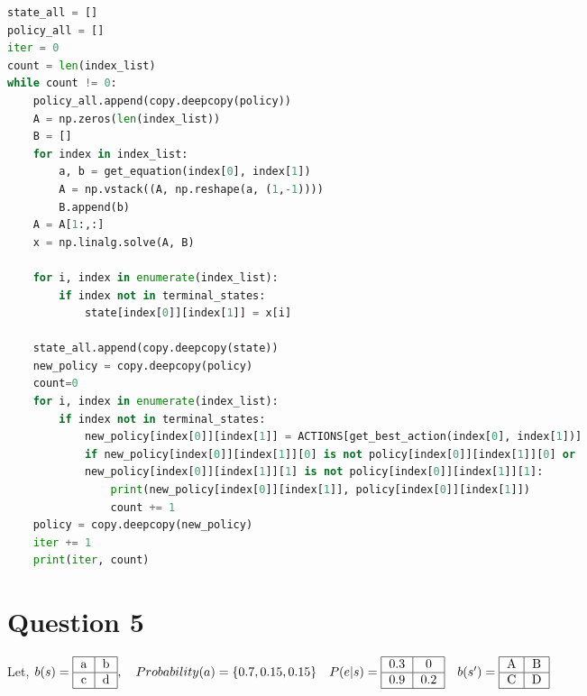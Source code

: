 \documentclass[letter, 10pt]{article}
\begin{document}
\begin{lstlisting}[language=Python]
state_all = []
policy_all = []
iter = 0
count = len(index_list)
while count != 0:
    policy_all.append(copy.deepcopy(policy))
    A = np.zeros(len(index_list))
    B = []
    for index in index_list:
        a, b = get_equation(index[0], index[1])
        A = np.vstack((A, np.reshape(a, (1,-1))))
        B.append(b)
    A = A[1:,:]
    x = np.linalg.solve(A, B)

    for i, index in enumerate(index_list):
        if index not in terminal_states:
            state[index[0]][index[1]] = x[i]
    
    state_all.append(copy.deepcopy(state))
    new_policy = copy.deepcopy(policy)
    count=0
    for i, index in enumerate(index_list):
        if index not in terminal_states:
            new_policy[index[0]][index[1]] = ACTIONS[get_best_action(index[0], index[1])]
            if new_policy[index[0]][index[1]][0] is not policy[index[0]][index[1]][0] or 
            new_policy[index[0]][index[1]][1] is not policy[index[0]][index[1]][1]:
                print(new_policy[index[0]][index[1]], policy[index[0]][index[1]])
                count += 1
    policy = copy.deepcopy(new_policy)
    iter += 1
    print(iter, count)
\end{lstlisting}
\newpage

\section*{Question 5}
Let,
$b(s) = \begin{tabular}{ |c|c| } 
                    \hline
                    a & b\\
                    \hline
                    c & d\\
                    \hline
                \end{tabular},\quad
Probability(a) = \{0.7, 0.15, 0.15\}\quad
P(e|s) = \begin{tabular}{ |c|c| } 
            \hline
            0.3 & 0\\
            \hline
            0.9 & 0.2\\
            \hline
        \end{tabular}\quad
b(s') = \begin{tabular}{ |c|c| } 
            \hline
            A & B\\
            \hline
            C & D\\
            \hline
        \end{tabular}$
\\
\end{document}
